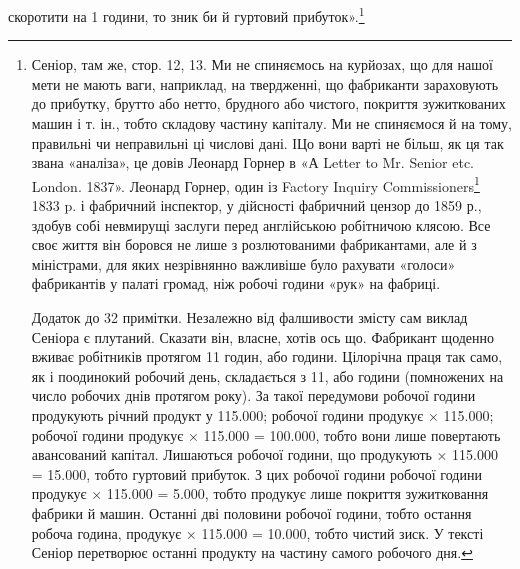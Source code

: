 скоротити на 1 години, то зник би й гуртовий прибуток».\footnote{
Сеніор, там же, стор. 12, 13. Ми не спиняємось на курйозах, що для нашої мети не мають ваги,
наприклад, на твердженні, що фабриканти зараховують до прибутку, брутто або нетто, брудного або
чистого, покриття зужиткованих машин і т. ін., тобто складову частину капіталу. Ми не
спиняємося й на тому, правильні чи неправильні ці числові дані. ІЦо вони
варті не більш, як ця так звана «аналіза», це довів Леонард Горнер в «А Letter to Mr. Senior etc.
London. 1837». Леонард Горнер, один із Factory Inquiry Commissioners\footnote*{
— членів комісії для розсліду відносин по фабриках. \emph{Ред.}
} 1833 p. і фабричний
інспектор, у дійсності
фабричний цензор до 1859 р., здобув собі невмирущі заслуги перед англійською робітничою клясою. Все
своє життя він боровся не лише з розлютованими фабрикантами, але й з міністрами, для яких
незрівнянно важливіше було рахувати «голоси» фабрикантів у палаті громад, ніж
робочі години «рук» на фабриці.

Додаток до 32 примітки. Незалежно від фалшивости змісту сам виклад Сеніора є плутаний. Сказати він,
власне, хотів ось що. Фабрикант щоденно вживає робітників протягом 11 годин, або  години.
Цілорічна праця так само, як і поодинокий робочий день, складається з 11,
або  години (помножених на число робочих днів протягом року). За такої передумови  робочої
години продукують річний продукт у 115.000;  робочої години продукує  ×
115.000;  робочої години продукує  × 115.000 = 100.000, тобто вони лише повертають
авансований капітал. Лишаються  робочої години, що продукують  × 115.000 =
15.000, тобто гуртовий прибуток. З цих  робочої години  робочої години
продукує  × 115.000 = 5.000, тобто продукує
лише покриття зужитковання фабрики й машин. Останні дві половини робочої години, тобто остання
робоча година, продукує  × 115.000 = 10.000, тобто чистий
зиск.
У тексті Сеніор перетворює останні  продукту на частину самого робочого
дня.
}

